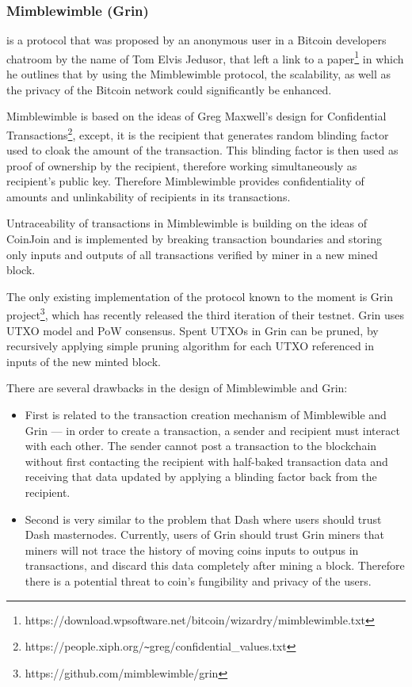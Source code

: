 \documentclass[a4paper, 10pt, conference]{ieeeconf}
\begin{document}
\subsubsection{Mimblewimble (Grin)} is a protocol that was proposed by an anonymous user in a Bitcoin developers chatroom by the name of Tom Elvis Jedusor, that left a link to a paper\footnote{https://download.wpsoftware.net/bitcoin/wizardry/mimblewimble.txt} in which he outlines that by using the Mimblewimble protocol, the scalability, as well as the privacy of the Bitcoin network could significantly be enhanced.

Mimblewimble is based on the ideas of Greg Maxwell's design for Confidential Transactions\footnote{https://people.xiph.org/\texttt{\~{}}greg/confidential\_values.txt},  except, it is the recipient that generates random blinding factor used to cloak the amount of the transaction. This blinding factor is then used as proof of ownership by the recipient, therefore working simultaneously as recipient's public key. Therefore Mimblewimble provides confidentiality of amounts and unlinkability of recipients in its transactions.

Untraceability of transactions in Mimblewimble is building on the ideas of CoinJoin and is implemented by breaking transaction boundaries and storing only inputs and outputs of all transactions verified by miner in a new mined block.

The only existing implementation of the protocol known to the moment is Grin project\footnote{https://github.com/mimblewimble/grin}, which has recently released the third iteration of their testnet. Grin uses UTXO model and PoW consensus. Spent UTXOs in Grin can be pruned, by recursively applying simple pruning algorithm for each UTXO referenced in inputs of the new minted block.

There are several drawbacks in the design of Mimblewimble and Grin:

\begin{itemize}
	\item {First is related to the transaction creation mechanism of Mimblewible and Grin --- in order to create a transaction, a sender and recipient must interact with each other. The sender cannot post a transaction to the blockchain without first contacting the recipient with half-baked transaction data and receiving that data updated by applying a blinding factor back from the recipient.}
	\item {Second is very similar to the problem that Dash where users should trust Dash masternodes. Currently, users of Grin should trust Grin miners that miners will not trace the history of moving coins inputs to outpus in transactions, and discard this data completely after mining a block. Therefore there is a potential threat to coin's fungibility and privacy of the users.}
\end{itemize}
\end{document}
